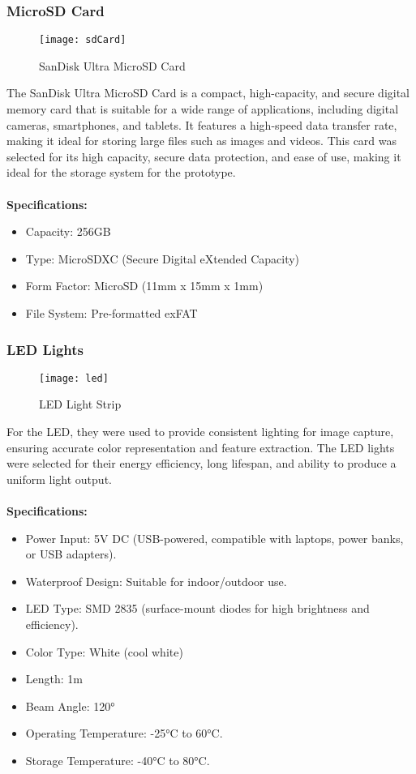 \subsubsection{MicroSD Card}
\begin{figure}[!htbp]
	\centering
	\texttt{[image: sdCard]}
	\caption{SanDisk Ultra MicroSD Card}
	\label{fig:sdCard_fig}
\end{figure}
The SanDisk Ultra MicroSD Card is a compact, high-capacity, and secure digital memory card 
that is suitable for a wide range of applications, including digital cameras, smartphones, and tablets.
It features a high-speed data transfer rate, making it ideal for storing large files such as images and videos.
This card was selected for its high capacity, secure data protection, and ease of use,
making it ideal for the storage system for the prototype. 
\\
\\
\textbf{Specifications:}
\begin{itemize}
    \item Capacity: 256GB
    \item Type: MicroSDXC (Secure Digital eXtended Capacity)
    \item Form Factor: MicroSD (11mm x 15mm x 1mm)
    \item File System: Pre-formatted exFAT
\end{itemize}

\subsubsection{LED Lights}
\begin{figure}[!htbp]
	\centering
	\texttt{[image: led]}
	\caption{LED Light Strip}
	\label{fig:led_fig}
\end{figure}
For the \gls{LED}, they were used to provide consistent lighting for image capture, ensuring accurate color representation and feature extraction.
The LED lights were selected for their energy efficiency, long lifespan, and ability to produce a uniform light output.
\\
\\
\textbf{Specifications:}
\begin{itemize}
    \item Power Input: 5V DC (USB-powered, compatible with laptops, power banks, or USB adapters).
    \item Waterproof Design: Suitable for indoor/outdoor use.
    \item LED Type: SMD 2835 (surface-mount diodes for high brightness and efficiency).
    \item Color Type: White (cool white)
    \item Length: 1m 
    \item Beam Angle: 120°
    \item Operating Temperature: -25°C to 60°C.
    \item Storage Temperature: -40°C to 80°C.
\end{itemize}


